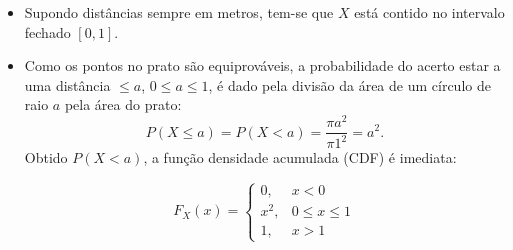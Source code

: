 \respostas

\begin{itemize}
    \item [a)] 
    Supondo distâncias sempre em metros, tem-se que $X$ está contido no intervalo fechado $[0, 1]$. 
    
    \item [b), c), d)] 
    Como os pontos no prato são equiprováveis, a probabilidade do acerto estar a uma distância $\leq a$, 
    $0 \leq a \leq 1$,
    é dado pela divisão da área de um círculo de raio $a$ pela área do prato:
    \begin{equation}
        P(X \leq a) = 
        P(X < a) = \frac{\pi a^2}{\pi 1^2} = a^2. 
    \end{equation}
    Obtido $P(X < a)$, a função densidade acumulada (CDF) é imediata:
    
    \begin{minipage}{.5\textwidth}
        \begin{equation}
            F_X(x) = 
            \begin{cases}
                0, & x < 0 \\
                x^2, & 0 \leq x \leq 1 \\
                1, & x > 1     
            \end{cases}
        \end{equation}
    \end{minipage}
    \begin{minipage}{.5\textwidth}
        \centering
    \end{minipage}
    

\end{itemize}
